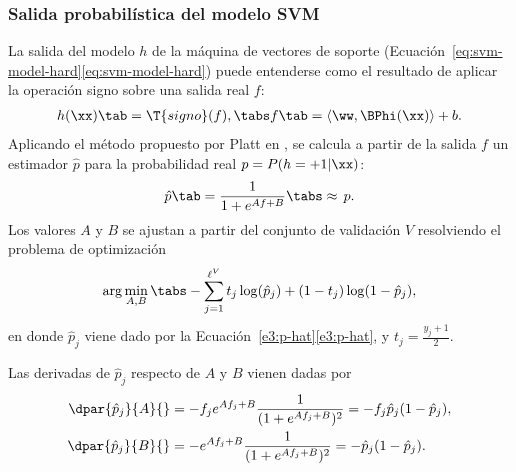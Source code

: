 %
\subsubsection{Salida probabilística del modelo SVM}
%
La salida del modelo $h$ de la máquina de vectores de soporte
(\iflatexml{}Ecuación~\ref{eq:svm-model-hard}\else\autoref{eq:svm-model-hard}\fi)
puede entenderse como el resultado de aplicar la operación signo sobre
una salida real $f$:
%
\begin{align}
\label{e3:svm-model-as-sign-f}
  h(\xx) \tab= \T{signo}(f),\tabs
  f\tab=\langle\ww,\BPhi(\xx)\rangle+b.
\end{align}
%
Aplicando el método propuesto por {Platt} en \cite{platt}, se
calcula a partir de la salida $f$ un estimador
$\hat{p}$ para la probabilidad real $p=P(h=+1|\xx)$:
%
\begin{align}
\label{e3:p-hat}
  \hat{p}\tab=\frac{1}{1+e^{Af+B}} \tabs\approx\,{}p.%
\end{align}
%
Los valores $A$ y $B$ se ajustan a partir del conjunto de
validación $V$ resolviendo el problema de
optimización
%
\begin{align}
  \arg\min_{A,B} \tabs -\sum_{j=1}^{\ell^V} t_j\log(\hat{p}_j)+(1-t_j)\log(1-\hat{p}_j),
  \label{abproblem}
\end{align}
%
en donde $\hat{p}_j$ viene dado por la
\iflatexml{}Ecuación~\ref{e3:p-hat}\else\autoref{e3:p-hat}\fi{}, y
$t_j=\frac{y_j+1}{2}$.
%

Las derivadas de $\hat{p}_j$ respecto de $A$ y $B$ vienen dadas por
%
\begin{align}
  \begin{split}
    \dpar{\hat{p}_j}{A}{}&=-f_j e^{Af_j+B}\frac{1}{(1+e^{Af_j+B})^2}
    =-f_j\hat{p}_j(1-\hat{p}_j),\\
    \dpar{\hat{p}_j}{B}{}&=    -e^{Af_j+B}\frac{1}{(1+e^{Af_j+B})^2}
    =-   \hat{p}_j(1-\hat{p}_j).
  \end{split}
\label{e3:deriv-pk-wrt-AB}
\end{align}
%


